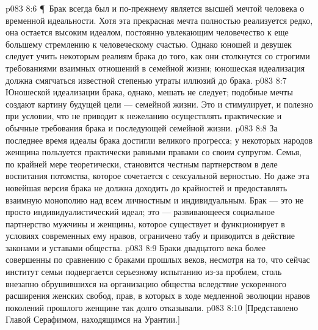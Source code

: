 \vs p083 8:6 \P\ Брак всегда был и по\hyp{}прежнему является высшей мечтой человека о временной идеальности. Хотя эта прекрасная мечта полностью реализуется редко, она остается высоким идеалом, постоянно увлекающим человечество к еще большему стремлению к человеческому счастью. Однако юношей и девушек следует учить некоторым реалиям брака до того, как они столкнутся со строгими требованиями взаимных отношений в семейной жизни; юношеская идеализация должна смягчаться известной степенью утраты иллюзий до брака.
\vs p083 8:7 Юношеской идеализации брака, однако, мешать не следует; подобные мечты создают картину будущей цели --- семейной жизни. Это и стимулирует, и полезно при условии, что не приводит к нежеланию осуществлять практические и обычные требования брака и последующей семейной жизни.
\vs p083 8:8 За последнее время идеалы брака достигли великого прогресса; у некоторых народов женщина пользуется практически равными правами со своим супругом. Семья, по крайней мере теоретически, становится честным партнерством в деле воспитания потомства, которое сочетается с сексуальной верностью. Но даже эта новейшая версия брака не должна доходить до крайностей и предоставлять взаимную монополию над всем личностным и индивидуальным. Брак --- это не просто индивидуалистический идеал; это --- развивающееся социальное партнерство мужчины и женщины, которое существует и функционирует в условиях современных ему нравов, ограничено табу и приводится в действие законами и уставами общества.
\vs p083 8:9 Браки двадцатого века более совершенны по сравнению с браками прошлых веков, несмотря на то, что сейчас институт семьи подвергается серьезному испытанию из\hyp{}за проблем, столь внезапно обрушившихся на организацию общества вследствие ускоренного расширения женских свобод, прав, в которых в ходе медленной эволюции нравов поколений прошлого женщине так долго отказывали.
\vs p083 8:10 [Представлено Главой Серафимом, находящимся на Урантии.]
